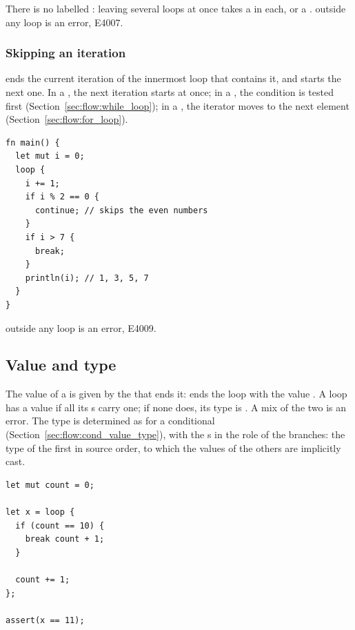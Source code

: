 There is no labelled : leaving several loops at once takes a
 in each, or a .  outside any loop is an
error, E4007.

\subsubsection{Skipping an iteration}
\label{sec:flow:continue}

 ends the current iteration of the innermost loop that contains
it, and starts the next one. In a , the next iteration starts at once;
in a , the condition is tested first
(Section~\ref{sec:flow:while_loop}); in a , the iterator moves to the
next element (Section~\ref{sec:flow:for_loop}).

\begin{lstlisting}[style=coloredverbatim, caption=Skipping iterations with \token{continue}, label=lst:flow:continue]
fn main() {
  let mut i = 0;
  loop {
    i += 1;
    if i % 2 == 0 {
      continue; // skips the even numbers
    }
    if i > 7 {
      break;
    }
    println(i); // 1, 3, 5, 7
  }
}
\end{lstlisting}

 outside any loop is an error, E4009.

\subsection{Value and type}

The value of a  is given by the  that ends it:
 ends the loop with the value . A loop has a value if
all its s carry one; if none does, its type is . A
mix of the two is an error. The
type is determined as for a conditional
(Section~\ref{sec:flow:cond_value_type}), with the s in the role of
the branches: the type of the first  in source order, to which the
values of the others are implicitly cast.

\begin{lstlisting}[style=coloredverbatim, label=lst:flow:simple_loop_break, caption=Breaking a loop with a value]
let mut count = 0;

let x = loop {
  if (count == 10) {
    break count + 1;
  }

  count += 1;
};

assert(x == 11);
\end{lstlisting}

